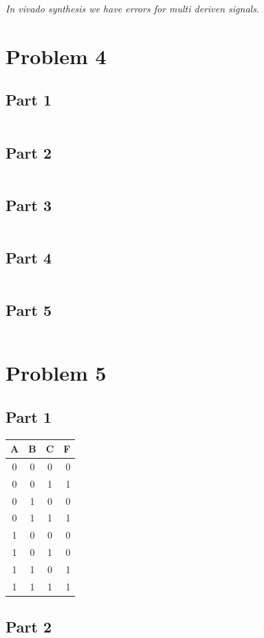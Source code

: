 \documentclass[paper=a4, fontsize=11pt]{scrartcl} %
\numberwithin{equation}{section} %
\numberwithin{figure}{section} %
\numberwithin{table}{section} %
\begin{document}
\textit{In vivado synthesis we have errors for multi deriven signals.}


\section{Problem 4}
\subsection{Part 1}
\inputminted{vhdl}{src/p4-1-2/p4-1.vhd}
\subsection{Part 2}
\inputminted{vhdl}{src/p4-1-2/p4-2.vhd}
\subsection{Part 3}
\inputminted{vhdl}{src/p4-3/p4-3.vhd}
\subsection{Part 4}
\inputminted{vhdl}{src/p4-4/p4-4.vhd}
\subsection{Part 5}
\inputminted{vhdl}{src/p4-5/p4-5.vhd}


\section{Problem 5}
\subsection{Part 1}
\begin{center}
	\begin{tabular}{c | c | c || r}
		A & B & C & F \\
		\hline
		0 & 0 & 0 & 0 \\
		\hline
		0 & 0 & 1 & 1 \\
		\hline
		0 & 1 & 0 & 0 \\
		\hline
		0 & 1 & 1 & 1 \\
		\hline
		1 & 0 & 0 & 0 \\
		\hline
		1 & 0 & 1 & 0 \\
		\hline
		1 & 1 & 0 & 1 \\
		\hline
		1 & 1 & 1 & 1 \\
		\hline
	\end{tabular}
\end{center}
\subsection{Part 2}
\inputminted{vhdl}{src/p5-2/p5-2.vhd}
\end{document}
